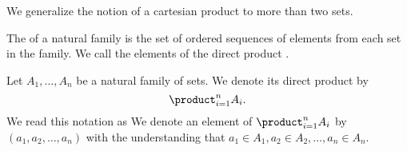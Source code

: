 
\sbasic














\sstart
{}


We generalize the notion
of a cartesian product to
more than two sets.


The 
of a natural family is
the set of ordered sequences
of elements from each set in the family.
We call the elements of the direct product
.


Let $A_1, \dots, A_n$ be a natural family
of sets. We denote its direct product by
\[
  \product_{i = 1}^{n} A_{i}.
\]
We read this notation as 
We denote an element of $\product_{i = 1}^{n} A_{i}$ by $(a_1, a_2, \dots, a_n)$ with the understanding that $a_1 \in A_1, a_2 \in A_2, \dots, a_n \in A_n$.


\strats
\strats
